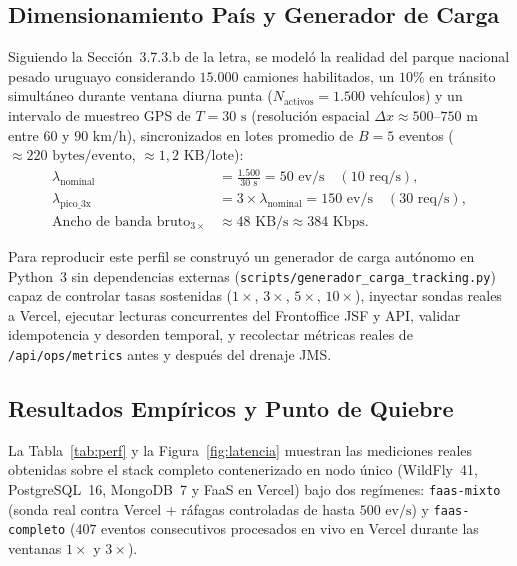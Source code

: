\documentclass[11pt,a4paper,twocolumn]{article}
\begin{document}
\subsection{Dimensionamiento País y Generador de Carga}

Siguiendo la Sección~3.7.3.b de la letra, se modeló la realidad del parque nacional pesado uruguayo considerando $15.000$ camiones habilitados, un $10\%$ en tránsito simultáneo durante ventana diurna punta ($N_{\text{activos}} = 1.500$ vehículos) y un intervalo de muestreo GPS de $T = 30\text{ s}$ (resolución espacial $\Delta x \approx 500\text{--}750\text{ m}$ entre $60$ y $90\text{ km/h}$), sincronizados en lotes promedio de $B = 5$ eventos ($\approx 220\text{ bytes/evento}$, $\approx 1{,}2\text{ KB/lote}$):
\begin{align}
\lambda_{\text{nominal}} &= \frac{1.500}{30\text{ s}} = 50\text{ ev/s} \quad (10\text{ req/s}),\\
\lambda_{\text{pico\_3x}} &= 3 \times \lambda_{\text{nominal}} = 150\text{ ev/s} \quad (30\text{ req/s}),\\
\text{Ancho de banda bruto}_{3\times} &\approx 48\text{ KB/s} \approx 384\text{ Kbps}.
\end{align}

Para reproducir este perfil se construyó un generador de carga autónomo en Python~3 sin dependencias externas (\texttt{scripts/generador\_carga\_tracking.py}) capaz de controlar tasas sostenidas ($1\times$, $3\times$, $5\times$, $10\times$), inyectar sondas reales a Vercel, ejecutar lecturas concurrentes del Frontoffice JSF y API, validar idempotencia y desorden temporal, y recolectar métricas reales de \texttt{/api/ops/metrics} antes y después del drenaje JMS.

\subsection{Resultados Empíricos y Punto de Quiebre}

La Tabla~\ref{tab:perf} y la Figura~\ref{fig:latencia} muestran las mediciones reales obtenidas sobre el stack completo contenerizado en nodo único (WildFly~41, PostgreSQL~16, MongoDB~7 y FaaS en Vercel) bajo dos regímenes: \texttt{faas-mixto} (sonda real contra Vercel + ráfagas controladas de hasta $500\text{ ev/s}$) y \texttt{faas-completo} ($407$ eventos consecutivos procesados en vivo en Vercel durante las ventanas $1\times$ y $3\times$).
\end{document}
